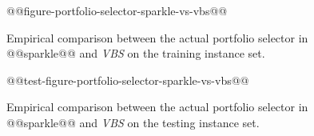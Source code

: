 \documentclass[british]{article}
\begin{document}
\begin{figure}[t]
\noindent \begin{centering}
@@figure-portfolio-selector-sparkle-vs-vbs@@
\par\end{centering}

\caption{Empirical comparison between the actual portfolio selector in @@sparkle@@ and \emph{VBS} on the training instance set.}\label{fig:sparkle_vs_vbs}
\end{figure}

\begin{figure}[t]
\noindent \begin{centering}
@@test-figure-portfolio-selector-sparkle-vs-vbs@@
\par\end{centering}

\caption{Empirical comparison between the actual portfolio selector in @@sparkle@@ and \emph{VBS} on the testing instance set.}\label{fig:test_sparkle_vs_vbs}
\end{figure}



\end{document}

